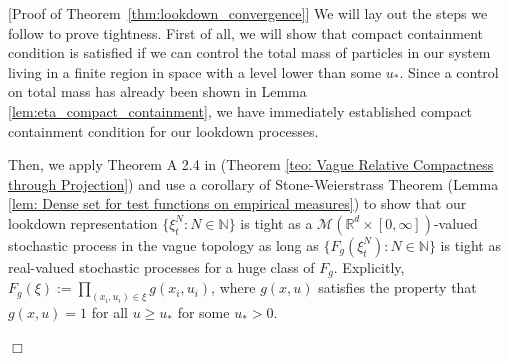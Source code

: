 \documentclass[12pt]{article}
\newenvironment {proof}{{\noindent\bf Proof }}{\hfill $\Box$ \medskip}
\newcommand{\IR}{\mathbb R}
\begin{document}
\begin{proof}[Proof of Theorem~\ref{thm:lookdown_convergence}]
We will lay out the steps we follow to prove tightness. First of all, we will
    show that compact containment condition is satisfied if we can control the
    total mass of particles in our system living in a finite region in space
    with a level lower than some $u_{*}$. Since a control on total mass has
    already been shown in Lemma \ref{lem:eta_compact_containment}, we have
    immediately established compact containment condition for our lookdown
    processes. 

Then, we apply Theorem A 2.4 in \cite{kallenberg1997foundations} (Theorem
    \ref{teo: Vague Relative Compactness through Projection}) and use a
    corollary of Stone-Weierstrass Theorem (Lemma \ref{lem: Dense set for test
    functions on empirical measures}) to show that our lookdown representation
    $\{\xi^N_t: N \in \mathbb{N}\}$ is tight as a $\mathcal{M}(\IR^d
    \times [0, \infty])$-valued stochastic process in the vague topology as
    long as $\{F_g(\xi^N_t): N \in \mathbb{N}\}$ is tight as real-valued
    stochastic processes for a huge class of $F_g$. Explicitly, $F_g(\xi):=
    \prod_{(x_i,u_i)\in \xi}g(x_i,u_i)$, where $g(x,u)$ satisfies the property
    that $g(x,u) = 1 $ for all $u \geq u_{*}$ for some $u_{*}>0$.


\end{proof}
\end{document}
